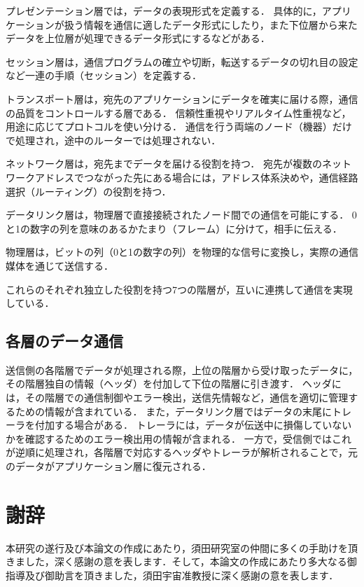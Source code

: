 \documentclass[12pt,a4j,titlepage]{ltjsarticle}
\begin{document}
プレゼンテーション層では，データの表現形式を定義する．
具体的に，アプリケーションが扱う情報を通信に適したデータ形式にしたり，また下位層から来たデータを上位層が処理できるデータ形式にするなどがある．

セッション層は，通信プログラムの確立や切断，転送するデータの切れ目の設定など一連の手順（セッション）を定義する．

トランスポート層は，宛先のアプリケーションにデータを確実に届ける際，通信の品質をコントロールする層である．
信頼性重視やリアルタイム性重視など，用途に応じてプロトコルを使い分ける．
通信を行う両端のノード（機器）だけで処理され，途中のルーターでは処理されない．

ネットワーク層は，宛先までデータを届ける役割を持つ．
宛先が複数のネットワークアドレスでつながった先にある場合には，アドレス体系決めや，通信経路選択（ルーティング）の役割を持つ．

データリンク層は，物理層で直接接続されたノード間での通信を可能にする．
0と1の数字の列を意味のあるかたまり（フレーム）に分けて，相手に伝える．

物理層は，ビットの列（0と1の数字の列）を物理的な信号に変換し，実際の通信媒体を通じて送信する．

これらのそれぞれ独立した役割を持つ7つの階層が，互いに連携して通信を実現している．

\subsection{各層のデータ通信}
送信側の各階層でデータが処理される際，上位の階層から受け取ったデータに，その階層独自の情報（ヘッダ）を付加して下位の階層に引き渡す．
ヘッダには，その階層での通信制御やエラー検出，送信先情報など，通信を適切に管理するための情報が含まれている．
また，データリンク層ではデータの末尾にトレーラを付加する場合がある．
トレーラには，データが伝送中に損傷していないかを確認するためのエラー検出用の情報が含まれる．
一方で，受信側ではこれが逆順に処理され，各階層で対応するヘッダやトレーラが解析されることで，元のデータがアプリケーション層に復元される．



\clearpage



\section{謝辞}
本研究の遂行及び本論文の作成にあたり，須田研究室の仲間に多くの手助けを頂きました，深く感謝の意を表します．そして，本論文の作成にあたり多大なる御指導及び御助言を頂きました，須田宇宙准教授に深く感謝の意を表します．
\end{document}
